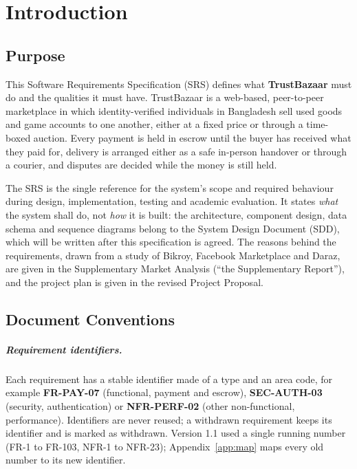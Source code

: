 \documentclass[11pt,a4paper]{report}
\begin{document}
\newpage
\tableofcontents
\newpage
\chapter{Introduction}

\section{Purpose}
This Software Requirements Specification (SRS) defines what \textbf{TrustBazaar} must do and the qualities it must have. TrustBazaar is a web-based, peer-to-peer marketplace in which identity-verified individuals in Bangladesh sell used goods and game accounts to one another, either at a fixed price or through a time-boxed auction. Every payment is held in escrow until the buyer has received what they paid for, delivery is arranged either as a safe in-person handover or through a courier, and disputes are decided while the money is still held.

The SRS is the single reference for the system's scope and required behaviour during design, implementation, testing and academic evaluation. It states \emph{what} the system shall do, not \emph{how} it is built: the architecture, component design, data schema and sequence diagrams belong to the System Design Document (SDD), which will be written after this specification is agreed. The reasons behind the requirements, drawn from a study of Bikroy, Facebook Marketplace and Daraz, are given in the Supplementary Market Analysis (``the Supplementary Report''), and the project plan is given in the revised Project Proposal.

\section{Document Conventions}

\paragraph{Requirement identifiers.} Each requirement has a stable identifier made of a type and an area code, for example \textbf{FR-PAY-07} (functional, payment and escrow), \textbf{SEC-AUTH-03} (security, authentication) or \textbf{NFR-PERF-02} (other non-functional, performance). Identifiers are never reused; a withdrawn requirement keeps its identifier and is marked as withdrawn. Version 1.1 used a single running number (FR-1 to FR-103, NFR-1 to NFR-23); Appendix~\ref{app:map} maps every old number to its new identifier.
\end{document}
